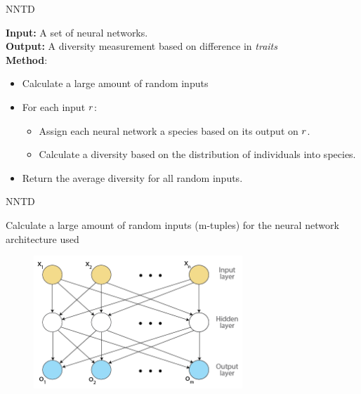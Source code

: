 \begin{frame}{NNTD}
\begin{center}
  \textbf{Input:} A set of neural networks.\\
  \textbf{Output:} A diversity measurement based on difference in \emph{traits}\\
  \vspace{30pt}
  \textbf{Method}:
  \begin{itemize}
  \item Calculate a large amount of random inputs
  \item For each input $r$:
  \begin{itemize}
	  \item Assign each neural network a species based on its output on $r$.
	  \item Calculate a diversity based on the distribution of individuals into species.
  \end{itemize}
  \item Return the average diversity for all random inputs.
  \end{itemize}
\end{center}
\end{frame}

\begin{frame}{NNTD}
\begin{center}
Calculate a large amount of random inputs (m-tuples) for the neural network architecture used
 \begin{figure}[p]
  \includegraphics[width=0.7\textwidth]{images/neuralnetwork.png}
  \end{figure}
\end{center}
\end{frame}

